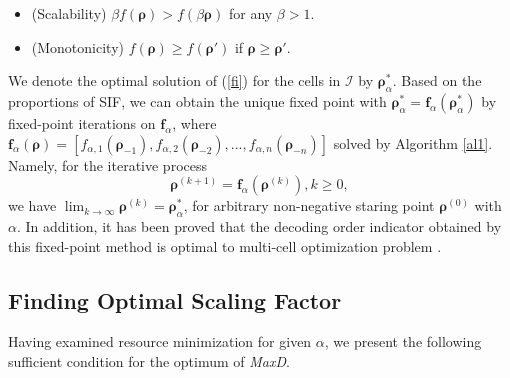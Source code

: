 \documentclass[10pt,journal,final,finalsubmission,twocolumn]{IEEEtran}
\begin{document}
\begin{itemize}

\item (Scalability) $\beta f\left(\boldsymbol{\rho}\right)> f\left(\beta\boldsymbol{\rho}\right)$ for any $\beta>1$.

\item (Monotonicity) $f\left(\boldsymbol{\rho}\right) \geq f\left(\boldsymbol{\rho}'\right)$ if $\boldsymbol{\rho} \geq \boldsymbol{\rho}'$.

\end{itemize}

We denote the optimal solution of (\ref{fi}) for the cells in $ \mathcal{I}$ by $\boldsymbol{\rho}^*_\alpha $. Based on the proportions of SIF, we can obtain the unique fixed point with 
$\boldsymbol{\rho}^* _\alpha= \boldsymbol{f}_\alpha \left(\boldsymbol{\rho}^*_\alpha\right)$ by fixed-point iterations on $\boldsymbol{f}_\alpha$, where $\boldsymbol{f}_\alpha\left(\boldsymbol{\rho}\right) = \left[ f_{\alpha,1}\left(\boldsymbol{\rho}_{-1}\right), f_{\alpha,2}\left(\boldsymbol{\rho}_{-2}\right), ..., f_{\alpha,n}\left(\boldsymbol{\rho}_{-n}\right)\right]$ solved by Algorithm \ref{al1}. Namely, for the iterative process 
\begin{equation}\label{iteration}
\boldsymbol{\rho}^{(k+1)} =\boldsymbol{f}_\alpha\left(\boldsymbol{\rho}^{(k)}\right), k\geq0,
\end{equation}
we have $\lim_{k\rightarrow \infty }\boldsymbol{\rho}^{(k)}=\boldsymbol{\rho}^*_\alpha$, for arbitrary non-negative staring point $\boldsymbol{\rho}^{(0)}$ with $\alpha$. In addition, it has been proved that the decoding order indicator obtained by this fixed-point method is optimal to multi-cell optimization problem \cite[Lemma 3]{You2}.


\subsection{Finding Optimal Scaling Factor}\label{bisection}

Having examined resource minimization for given $\alpha$, we present the following sufficient condition for the optimum of {\em MaxD}.
  
\end{document}
